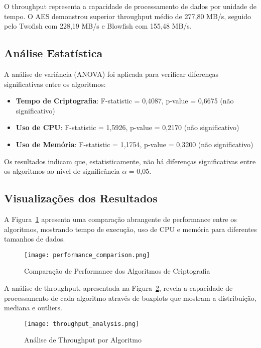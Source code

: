 \documentclass[12pt,a4paper,oneside]{article}
\begin{document}
O throughput representa a capacidade de processamento de dados por unidade de tempo. O AES demonstrou superior throughput médio de 277,80 MB/s, seguido pelo Twofish com 228,19 MB/s e Blowfish com 155,48 MB/s.

\subsection{Análise Estatística}

A análise de variância (ANOVA) foi aplicada para verificar diferenças significativas entre os algoritmos:

\begin{itemize}
    \item \textbf{Tempo de Criptografia}: F-statistic = 0,4087, p-value = 0,6675 (não significativo)
    \item \textbf{Uso de CPU}: F-statistic = 1,5926, p-value = 0,2170 (não significativo)
    \item \textbf{Uso de Memória}: F-statistic = 1,1754, p-value = 0,3200 (não significativo)
\end{itemize}

Os resultados indicam que, estatisticamente, não há diferenças significativas entre os algoritmos ao nível de significância $\alpha$ = 0,05.

\subsection{Visualizações dos Resultados}

A Figura~\ref{fig:performance} apresenta uma comparação abrangente de performance entre os algoritmos, mostrando tempo de execução, uso de CPU e memória para diferentes tamanhos de dados.

\begin{figure}[H]
\centering
\texttt{[image: performance\_comparison.png]}
\caption{Comparação de Performance dos Algoritmos de Criptografia}
\label{fig:performance}
\end{figure}

A análise de throughput, apresentada na Figura~\ref{fig:throughput}, revela a capacidade de processamento de cada algoritmo através de boxplots que mostram a distribuição, mediana e outliers.

\begin{figure}[H]
\centering
\texttt{[image: throughput\_analysis.png]}
\caption{Análise de Throughput por Algoritmo}
\label{fig:throughput}
\end{figure}
\end{document}
